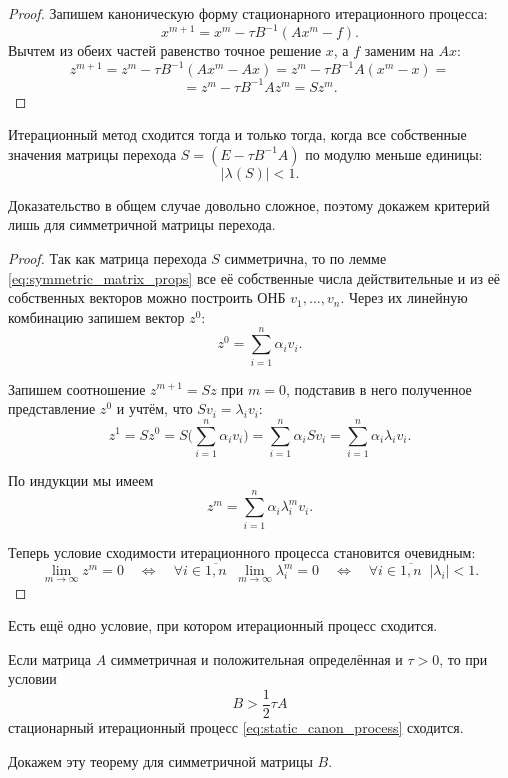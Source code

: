 \documentclass{article}
\begin{document}
\begin{proof}
	Запишем каноническую форму стационарного итерационного процесса:
	\[x^{m+1}=x^m-\tau B^{-1}(Ax^m-f).\]
	Вычтем из обеих частей равенство точное решение $x$, а $f$ заменим на
	$Ax$:
	\[z^{m+1}=z^m-\tau B^{-1}(Ax^m-Ax)=z^m-\tau B^{-1}A(x^m-x)=\]
	\[=z^m-\tau B^{-1}Az^m=Sz^m.\]
\end{proof}

\begin{theorem}
\label{eq:sle_convergence_criterion}
	Итерационный метод сходится тогда и только тогда, когда все собственные
	значения матрицы перехода $S=(E-\tau B^{-1}A)$ по модулю меньше единицы:
	\[|\lambda (S)|<1.\]
\end{theorem}

Доказательство в общем случае довольно сложное, поэтому докажем критерий лишь
для симметричной матрицы перехода.

\begin{proof}
	Так как матрица перехода $S$ симметрична, то по лемме
	\eqref{eq:symmetric_matrix_props} все её собственные числа
	действительные и из её собственных векторов можно построить ОНБ
	$v_1,...,v_n$. Через их линейную комбинацию запишем вектор $z^0$:
	\[z^0=\sum_{i=1}^{n}\alpha_iv_i.\]

	Запишем соотношение $z^{m+1}=Sz$ при $m=0$, подставив в него полученное
	представление $z^0$ и учтём, что $Sv_i=\lambda_iv_i$:
	\[z^1=Sz^0=S\Big(\sum_{i=1}^{n}\alpha_iv_i\Big)=
	\sum_{i=1}^{n}\alpha_iSv_i=
	\sum_{i=1}^{n}\alpha_i\lambda_iv_i.\]

	По индукции мы имеем
	\[z^m=\sum_{i=1}^{n}\alpha_i\lambda_i^mv_i.\]

	Теперь условие сходимости итерационного процесса становится очевидным:
	\[\lim_{m\to\infty}z^m=0\quad\Leftrightarrow\quad
	\forall i\in\overline{1,n}\;\;\lim_{m\to\infty}\lambda_i^m=0\quad
	\Leftrightarrow\quad \forall i\in\overline{1,n}\;\;|\lambda_i|<1.\]
\end{proof}

Есть ещё одно условие, при котором итерационный процесс сходится.

\begin{theorem}[Самарского]
	Если матрица $A$ симметричная и положительная определённая и $\tau>0$,
	то при условии
	\[B>\frac{1}{2}\tau A\]
	стационарный итерационный процесс \eqref{eq:static_canon_process}
	сходится.
\end{theorem}

Докажем эту теорему для симметричной матрицы $B$.
\end{document}
